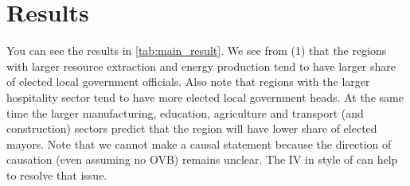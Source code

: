 \documentclass[12pt]{article}
\numberwithin{equation}{section}
\numberwithin{table}{section}
\numberwithin{figure}{section}
\begin{document}
\section{Results}

You can see the results in \vref{tab:main_result}. We see from (1) that the regions with larger resource extraction and energy production tend to have larger share of elected local government officials. Also note that regions with the larger hospitality sector tend to have more elected local government heads. At the same time the larger manufacturing, education, agriculture and transport (and construction) sectors predict that the region will have lower share of elected mayors. 
Note that we cannot make a causal statement because the direction of causation (even assuming no OVB) remains unclear. 
The IV in style of \citet{AsherNovosad2023} can help to resolve that issue.
\end{document}
